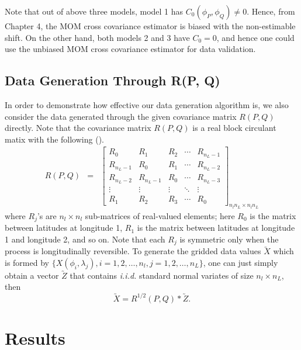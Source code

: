 \noi Note that out of above three models, model 1 has $C_0(\phi_P, \phi_Q) \ne 0$. Hence, from Chapter 4, the MOM cross covariance estimator is biased with the non-estimable shift. On the other hand, both models 2 and 3 have $C_0 = 0$, and hence one could use the unbiased MOM cross covariance estimator for data validation. 

\subsection{Data Generation Through R(P, Q)}

In order to demonstrate how effective our data generation algorithm is, we also consider the data generated through the given covariance matrix $R(P, Q)$ directly. Note that the covariance matrix $R(P, Q)$ is a real block circulant matix with the following (\citealp{Li2013, JunStein2008}). 
 \begin{eqnarray}
	R(P,Q) &=& \left[
		\begin{array}{lllll}
			R_0     & R_1     & R_2    & \cdots & R_{n_L-1} \\
			R_{n_L-1} & R_0     & R_1    & \cdots & R_{n_L-2} \\
			R_{n_L-2} & R_{n_L-1} & R_0    & \cdots & R_{n_L-3} \\
			\vdots  & \vdots  & \vdots & \ddots & \vdots  \\
			R_1     & R_2     & R_3    & \cdots & R_0
		\end{array}
	\right]_{n_ln_L\times n_ln_L}
\end{eqnarray}
where $R_j$'s are $n_l\times n_l$ sub-matrices of real-valued elements; here $R_0$ is the \cov matrix between latitudes at longitude 1, $R_1$ is the \cov matrix between latitudes at longitude 1 and longitude 2, and so on. Note that each $R_j$ is symmetric only when the process is longitudinally reversible. To generate the gridded data values $\utilde{X}$ which is formed by $\{X(\phi_i, \lambda_j), i = 1, 2, \ldots, n_l, j = 1, 2, \ldots, n_L\}$, one can just simply obtain a vector $\utilde{Z}$ that contains {\em i.i.d.} standard normal variates of size $n_l \times n_L$, then
\[
\utilde{X} = R^{1/2}(P, Q)*\utilde{Z}.
\] 

\section{Results}
	

